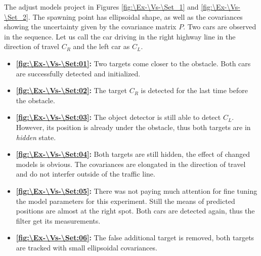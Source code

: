 The adjust models project in Figures \ref{fig:\Ex-\Vs-\Set_1} and \ref{fig:\Ex-\Vs-\Set_2}. The spawning point has
ellipsoidal shape, as well as the covariances showing the uncertainty given by the covariance matrix $P$. Two cars
are observed in the sequence. Let us call the car driving in the right highway line in the direction of travel $C_R$
and the left car as $C_L$.

\begin{itemize}
    \item \textbf{\ref{fig:\Ex-\Vs-\Set:01}:} Two targets come closer to the obstacle. Both cars are successfully
    detected and initialized.
    \item \textbf{\ref{fig:\Ex-\Vs-\Set:02}:} The target $C_R$ is detected for the last time before the obstacle.
    \item \textbf{\ref{fig:\Ex-\Vs-\Set:03}:} The object detector is still able to detect $C_L$. However, its
    position is already under the obstacle, thus both targets are in \textit{hidden} state.
    \item \textbf{\ref{fig:\Ex-\Vs-\Set:04}:} Both targets are still hidden, the effect of changed models is obvious. The covariances are elongated in the direction of travel and do not interfer outside of the traffic line.
    \item \textbf{\ref{fig:\Ex-\Vs-\Set:05}:} There was not paying
    much attention for fine tuning the model parameters for this experiment. Still the means of predicted positions
    are almost at the right spot. Both cars are detected again, thus the filter get its measurements.
    \item \textbf{\ref{fig:\Ex-\Vs-\Set:06}:} The false additional target is removed, both targets are tracked with
    small ellipsoidal covariances.
\end{itemize}


